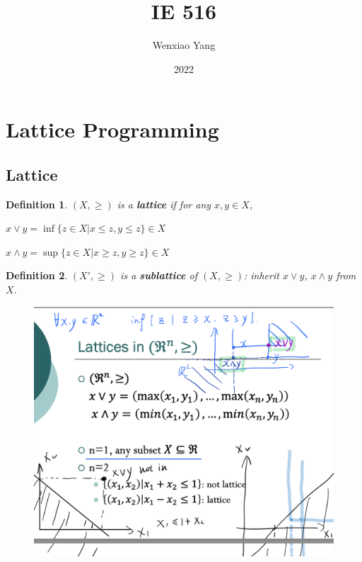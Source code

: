 \documentclass[11pt,a4paper]{article}
\title{IE 516}
\author[*]{Wenxiao Yang}
\affil[*]{Department of Mathematics, University of Illinois at Urbana-Champaign}
\date{2022}
\newtheorem{definition}{Definition}
\begin{document}
\maketitle
\tableofcontents
\newpage







\section{Lattice Programming}
\subsection{Lattice}
\begin{definition}
    $(X,\geq)$ is a \textbf{lattice} if for any $x,y\in X$,

    \quad $x\vee y=\inf\{z\in X | x\leq z, y\leq z\}\in X$

    \quad $x\wedge y=\sup \{z\in X| x\geq z,y\geq z\}\in X$
\end{definition}

\begin{definition}
    $(X',\geq)$ is a \textbf{sublattice} of $(X,\geq)$: inherit $x\vee y$, $x\wedge y$ from $X$.
\end{definition}

\begin{center}\begin{figure}[htbp]
    \centering
    \includegraphics[scale=0.5]{lattice1.png}
    \caption{}
    \label{}
\end{figure}\end{center}
\end{document}
